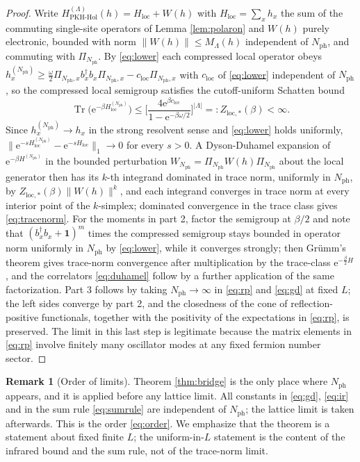 \documentclass[11pt]{article}
\numberwithin{equation}{section}
\newcommand{\e}{\mathrm{e}}
\newcommand{\Tr}{\operatorname{Tr}}
\newcommand{\id}{\mathbf{1}}
\newcommand{\Lamb}{\Lambda}
\newcommand{\PKH}{\mathrm{PKH\text{-}Hol}}
\newcommand{\fN}{N_{\mathrm{ph}}}
\theoremstyle{definition}
\newtheorem{remark}[theorem]{Remark}
\begin{document}
\begin{proof}
Write $H^{(\Lamb)}_{\PKH}(h)=H_{\mathrm{loc}}+W(h)$ with
$H_{\mathrm{loc}}=\sum_{x}h_{x}$ the sum of the commuting single-site operators of
Lemma \ref{lem:polaron} and $W(h)$ purely electronic, bounded with norm
$\|W(h)\|\le M_{\Lamb}(h)$ independent of $\fN$, and commuting with $\Pi_{\fN}$. By
\eqref{eq:lower} each compressed local operator obeys
$h^{(\fN)}_{x}\ge\frac{\omega}{2}\Pi_{\fN,x}b_{x}^{\dagger}b_{x}\Pi_{\fN,x}-c_{\mathrm{loc}}\Pi_{\fN,x}$
with $c_{\mathrm{loc}}$ of \eqref{eq:lower} independent of $\fN$, so the compressed local
semigroup satisfies the cutoff-uniform Schatten bound
\begin{equation}
\Tr\Big(\e^{-\beta H^{(\fN)}_{\mathrm{loc}}}\Big)\le\Big[\frac{4\e^{\beta c_{\mathrm{loc}}}}{1-\e^{-\beta\omega/2}}\Big]^{|\Lamb|}=:Z_{\mathrm{loc},*}(\beta)<\infty .
\label{eq:schatten}
\end{equation}
Since $h^{(\fN)}_{x}\to h_{x}$ in the strong resolvent sense and \eqref{eq:lower} holds uniformly,
$\|\e^{-sH^{(\fN)}_{\mathrm{loc}}}-\e^{-sH_{\mathrm{loc}}}\|_{1}\to0$ for every $s>0$. A
Dyson-Duhamel expansion of $\e^{-\beta H^{(\fN)}}$ in the bounded perturbation
$W_{\fN}=\Pi_{\fN}W(h)\Pi_{\fN}$ about the local generator then has its $k$-th
integrand dominated in trace norm, uniformly in $\fN$, by
$Z_{\mathrm{loc},*}(\beta)\|W(h)\|^{k}$, and each integrand converges in trace norm at
every interior point of the $k$-simplex; dominated convergence in the trace class gives
\eqref{eq:tracenorm}. For the moments in part 2, factor the semigroup at $\beta/2$ and note that
$(b_{x}^{\dagger}b_{x}+\id)^{m}$ times the compressed semigroup stays bounded in
operator norm uniformly in $\fN$ by \eqref{eq:lower}, while it converges strongly; then
Gr\"umm's theorem gives trace-norm convergence after multiplication by the
trace-class $\e^{-\frac{\beta}{2}H}$, and the correlators \eqref{eq:duhamel} follow by a further
application of the same factorization. Part 3 follows by taking $\fN\to\infty$ in
\eqref{eq:rp} and \eqref{eq:gd} at fixed $L$; the left sides converge by part 2, and the closedness of
the cone of reflection-positive functionals, together with the positivity of the
expectations in \eqref{eq:rp}, is preserved. The limit in this last step is legitimate because
the matrix elements in \eqref{eq:rp} involve finitely many oscillator modes at any fixed
fermion number sector.
\end{proof}

\begin{remark}[Order of limits]\label{rem:order}
Theorem \ref{thm:bridge} is the only place where $\fN$ appears, and it is applied before
any lattice limit. All constants in \eqref{eq:gd}, \eqref{eq:ir} and in the sum rule
\eqref{eq:sumrule} are independent of $\fN$; the lattice limit is taken afterwards. This is the order \eqref{eq:order}. We emphasize that
the theorem is a statement about fixed finite $L$; the uniform-in-$L$ statement is the
content of the infrared bound and the sum rule, not of the trace-norm limit.
\end{remark}
\end{document}
